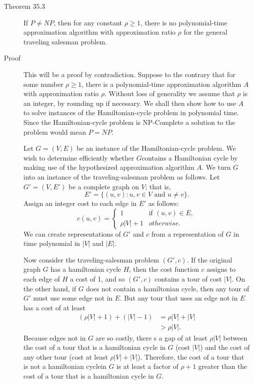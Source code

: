 \begin{description}
\item[Theorem 35.3] If $P\neq NP$, then for any constant $\rho \geq 1$, there is
  no polynomial-time approximation algorithm with approximation ratio $\rho$ for
  the general traveling salesman problem.

\item[Proof] This will be a proof by contradiction. Suppose to the contrary that
  for some number $\rho \geq 1$, there is a polynomial-time approximation
  algorithm $A$ with approximation ratio $\rho$. Without loss of generality we
  assume that $\rho$ is an integer, by rounding up if necessary.  We shall then
  show how to use $A$ to solve instances of the Hamiltonian-cycle problem in
  polynomial time. Since the Hamiltonian-cycle problem is NP-Complete a solution
  to the problem would mean $P=NP$.

  Let $G = (V,E)$ be an instance of the Hamiltonian-cycle problem. We wish to
  determine efficiently whether $G$contains a Hamiltonian cycle by making use of
  the hypothesized approximation algorithm $A$.  We turn $G$ into an instance of
  the traveling-salesman problem as follows. Let $G' = (V,E')$ be a complete
  graph on $V$; that is,
  \[
    E' = \{(u,v) : u,v \in V \text{ and } u\neq v\}.
  \]
  Assign an integer cost to each edge in $E'$ as follows:
  \[
    c(u,v) = \begin{cases}
      1         & \text{if } (u,v) \in E,\\
      \rho|V|+1 & otherwise.
    \end{cases}
  \]
  We can create representations of $G'$ and $c$ from a representation of $G$ in
  time polynomial in $|V|$ and $|E|$.

  Now consider the traveling-salesman problem $(G',c)$. If the original graph
  $G$ has a hamiltonian cycle $H$, then the cost function $c$ assigns to each
  edge of $H$ a cost of 1, and so $(G',c)$ contains a tour of cost $|V|$. On the
  other hand, if $G$ does not contain a hamiltonian cycle, then any tour of $G'$
  must use some edge not in $E$.  But any tour that uses an edge not in $E$ has
  a cost of at least
  \begin{align*}
    (\rho|V|+1)+(|V|-1) &= \rho|V|+|V| \\
                        &> \rho|V|.
  \end{align*}
  Because edges not in $G$ are so costly, there s a gap of at least $\rho|V|$
  between the cost of a tour that is a hamiltonian cycle in $G$ (cost $|V|$) and
  the cost of any other tour (cost at least $\rho|V|+|V|$). Therefore, the cost
  of a tour that is not a hamiltonian cyclein $G$ is at least a factor of
  $\rho+1$ greater than the cost of a tour that is a hamiltonian cycle in $G$.


\end{description}
